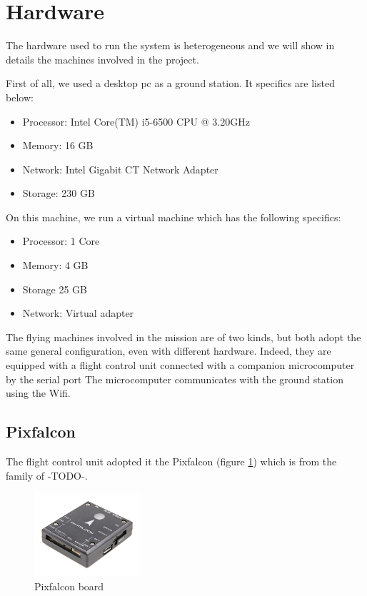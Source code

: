 \section{Hardware}

The hardware used to run the system is heterogeneous and we will show in details
the machines involved in the project.

First of all, we used a desktop pc as a ground station. It specifics are listed below:
\begin{itemize}
  \item Processor: Intel Core(TM) i5-6500 CPU @ 3.20GHz
  \item Memory: 16 GB
  \item Network: Intel Gigabit CT Network Adapter
  \item Storage: 230 GB
\end{itemize}

On this machine, we run a virtual machine which has the following specifics:
\begin{itemize}
  \item Processor: 1 Core
  \item Memory: 4 GB
  \item Storage 25 GB
  \item Network: Virtual adapter
\end{itemize}

The flying machines involved in the mission are of two kinds, but both adopt the
same general configuration, even with different hardware. Indeed, they are equipped
with a flight control unit connected with a companion microcomputer by the serial port
The microcomputer communicates with the ground station using the Wifi.

\subsection{Pixfalcon}
The flight control unit adopted it the Pixfalcon (figure \ref{fig:hardware_pixfalcon})
which is from the family of -TODO-.%

\begin{figure}[h]
\centering
\includegraphics[width=0.35\textwidth]{chapters/chapter-03/figures/hardware_pixfalcon.png}
\caption{Pixfalcon board}
\label{fig:hardware_pixfalcon}
\end{figure}

